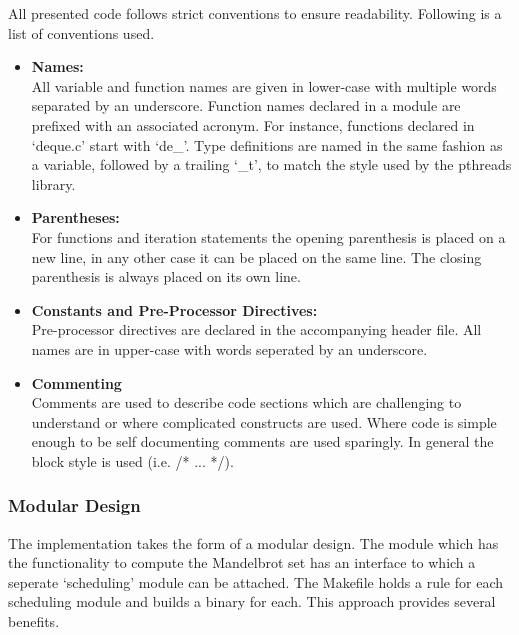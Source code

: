 All presented code follows strict conventions to ensure readability. Following is a list of conventions used.
\begin{itemize}
\item \textbf{Names: } \\
            All variable and function names are given in lower-case with multiple words separated by an underscore.
            Function names declared in a module are prefixed with an associated acronym. For instance, functions declared in 
            `deque.c' start with `de\_'.
            Type definitions are named in the same fashion as a variable, followed by a trailing `\_t', to match the style used 
            by the pthreads library.
            
\item \textbf{Parentheses: } \\
            For functions and iteration statements the opening parenthesis is placed on a new line, in any other case it
            can be placed on the same line. The closing parenthesis is always placed on its own line.
                        
\item \textbf{Constants and Pre-Processor Directives: } \\
            Pre-processor directives are declared in the accompanying header file. All names are in upper-case
            with words seperated by an underscore.
\item \textbf{Commenting} \\
            Comments are used to describe code sections which are challenging to understand or 
            where complicated constructs are used. 
            Where code is simple enough to be self documenting comments are used sparingly.
            In general the block style is used (i.e. /{}* ... *{}/).
\end{itemize}

\subsubsection*{Modular Design}

The implementation takes the form of a modular design. The module which has the functionality to compute the Mandelbrot set
has an interface to which a seperate `scheduling' module can be attached. The Makefile holds a rule for each scheduling 
module and builds a binary for each. This approach provides several benefits. 

